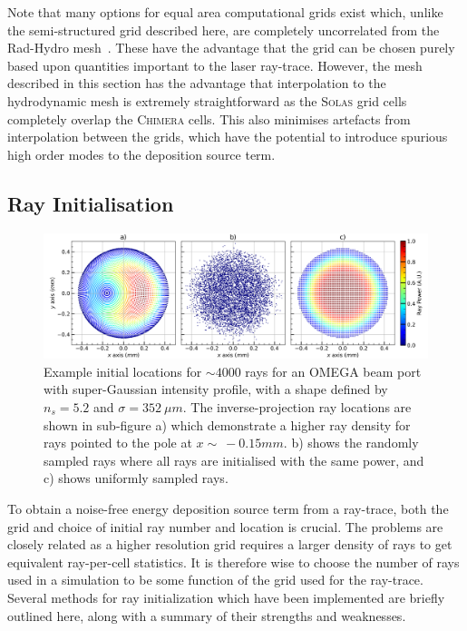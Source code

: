 Note that many options for equal area computational grids exist which, unlike the semi-structured grid described here, are completely uncorrelated from the \ac{Rad-Hydro} mesh~\cite{cheong_eigensolutions_2015,malkin_new_2019}.
These have the advantage that the grid can be chosen purely based upon quantities important to the laser ray-trace.
However, the mesh described in this section has the advantage that interpolation to the hydrodynamic mesh is extremely straightforward as the \textsc{Solas} grid cells completely overlap the \textsc{Chimera} cells.
This also minimises artefacts from interpolation between the grids, which have the potential to introduce spurious high order modes to the deposition source term.

\subsection{Ray Initialisation}%
\label{sec:SOLAS_ray_init}

\begin{figure}[t!]
    \includegraphics[width=\linewidth]{Numerics/Images/ray_init_plots.png}
    \centering
    \caption{Example initial locations for $\sim4000$ rays for an OMEGA beam port with super-Gaussian intensity profile, with a shape defined by $n_s=5.2$ and $\sigma=352\ \mu m$.
    The inverse-projection ray locations are shown in sub-figure a) which demonstrate a higher ray density for rays pointed to the pole at $x\sim\ -0.15 mm$.
    b) shows the randomly sampled rays where all rays are initialised with the same power, and c) shows uniformly sampled rays.}%
    \label{fig:SOLAS_ray_init}
\end{figure}

To obtain a noise-free energy deposition source term from a ray-trace, both the grid and choice of initial ray number and location is crucial.
The problems are closely related as a higher resolution grid requires a larger density of rays to get equivalent ray-per-cell statistics.
It is therefore wise to choose the number of rays used in a simulation to be some function of the grid used for the ray-trace.
Several methods for ray initialization which have been implemented are briefly outlined here, along with a summary of their strengths and weaknesses.

